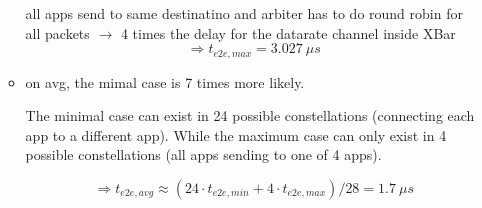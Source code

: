 \documentclass[]{scrartcl}
\begin{document}
\begin{itemize}
\begin{itemize}
                    all apps send to same destinatino and arbiter has to do round robin for all packets $\rightarrow$ 4 times the delay for the datarate channel inside XBar
                    \begin{equation}
                        \Rightarrow t_{e2e, max} = \SI{3.027}{\mu s}
                    \end{equation}

                \item on avg, the mimal case is 7 times more likely.

                    The minimal case can exist in 24 possible constellations (connecting each app to a different app).
                    While the maximum case can only exist in 4 possible constellations (all apps sending to one of 4 apps).

                    \begin{equation}
                        \Rightarrow t_{e2e, avg} \approx \left( 24\cdot t_{e2e,min} + 4\cdot t_{e2e,max}\right)/28 = \SI{1.7}{\mu s}
                    \end{equation}


\end{itemize}
\end{itemize}
\end{document}
